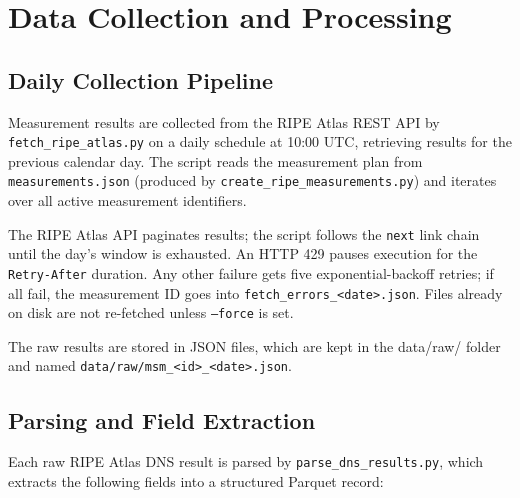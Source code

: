 \section{Data Collection and Processing}
\label{sec:3.4}

\subsection{Daily Collection Pipeline}
\label{subsec:3.4.1}

Measurement results are collected from the RIPE Atlas REST API by \texttt{fetch\_ripe\_atlas.py} on a daily schedule at 10:00 UTC, retrieving results for the previous calendar day. The script reads the measurement plan from \texttt{measurements.json} (produced by \texttt{create\_ripe\_measurements.py}) and iterates over all active measurement identifiers.

The RIPE Atlas API paginates results; the script follows the \texttt{next} link chain until the day's window is exhausted. An \ac{HTTP} 429 pauses execution for the \texttt{Retry-After} duration. Any other failure gets five exponential-backoff retries; if all fail, the measurement ID goes into \texttt{fetch\_errors\_<date>.json}. Files already on disk are not re-fetched unless \texttt{--force} is set.

The raw results are stored in JSON files, which are kept in the data/raw/ folder and named \texttt{data/raw/m\-sm\_<id>\_<date>.json}.

\subsection{Parsing and Field Extraction}
\label{subsec:3.4.2}

Each raw RIPE Atlas \ac{DNS} result is parsed by \texttt{parse\_dns\_results.py}, which extracts the following fields into a structured Parquet record:

